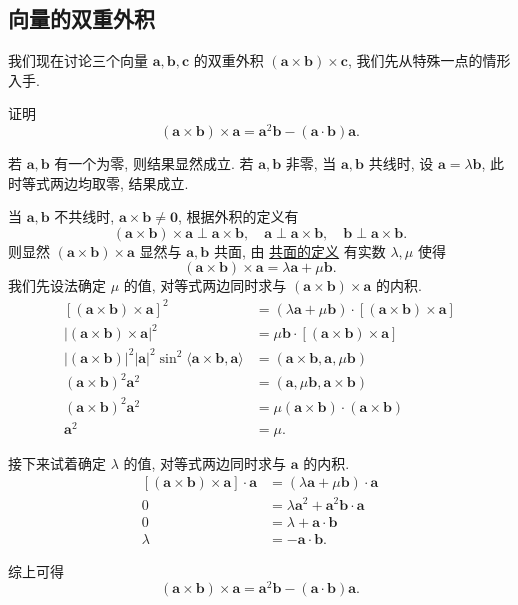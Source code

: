 \documentclass[cn,toc=twocol]{elegantbook}
\newcommand{\ve}[1]{\boldsymbol{#1}}
\newcommand{\vtimes}[2]{\ve{#1} \times \ve{#2}}
\begin{document}
\subsection{向量的双重外积}

我们现在讨论三个向量 $\ve a, \ve b, \ve c$ 的双重外积 $(\vtimes ab) \times\ve c$, 我们先从特殊一点的情形入手.

\begin{example}
	证明
	\[
		(\vtimes ab) \times \ve a = \ve a^2 \ve b - (\ve a \cdot \ve b) \ve a.
	\]
\end{example}

\begin{solution}
	若 $\ve a, \ve b$ 有一个为零, 则结果显然成立. 若 $\ve a, \ve b$ 非零, 当 $\ve a, \ve b$ 共线时, 设 $\ve a = \lambda \ve b$, 此时等式两边均取零, 结果成立.
	
	当 $\ve a, \ve b$ 不共线时, $\vtimes ab \neq \ve 0$, 根据外积的定义有
	\[
		(\vtimes ab)\times \ve a \perp \vtimes ab,\quad \ve a \perp \vtimes ab,\quad \ve b \perp \vtimes ab.
	\]
	则显然 $(\vtimes ab)\times \ve a$ 显然与 $\ve a, \ve b$ 共面, 由 \hyperref[def:coplanarity]{共面的定义} 有实数 $\lambda, \mu$ 使得
	\[
		(\vtimes ab)\times \ve a = \lambda \ve a + \mu \ve b.
	\]
	我们先设法确定 $\mu$ 的值, 对等式两边同时求与 $(\vtimes ab)\times \ve a$ 的内积.
	\[
	\begin{aligned}
		[(\vtimes ab)\times \ve a] ^2 &= (\lambda \ve a + \mu \ve b) \cdot [(\vtimes ab)\times \ve a]\\
		\lvert(\vtimes ab)\times \ve a\rvert ^2 &= \mu \ve b \cdot [(\vtimes ab)\times \ve a]\\
		\lvert (\vtimes ab) \rvert ^2 \lvert \ve a \rvert^2 \sin^2\langle \vtimes ab, \ve a \rangle &= (\vtimes ab, \ve a, \mu \ve b)\\
		(\vtimes ab)^2 \ve a ^2 &= (\ve a, \mu \ve b, \vtimes ab)\\
		(\vtimes ab)^2 \ve a ^2 &= \mu (\vtimes ab) \cdot (\vtimes ab)\\
		\ve a ^2 &= \mu.
	\end{aligned}
	\]
	
	接下来试着确定 $\lambda$ 的值, 对等式两边同时求与 $\ve a$ 的内积.
	\[
	\begin{aligned}
		[(\vtimes ab) \times \ve a] \cdot \ve a &= (\lambda \ve a + \mu \ve b) \cdot \ve a\\
		0 &= \lambda \ve a ^2 + \ve a^2 \ve b \cdot \ve a\\
		0 &= \lambda + \ve a \cdot \ve b\\
		\lambda &= - \ve a \cdot \ve b.
	\end{aligned}
	\]
	
	综上可得
	\[
		(\vtimes ab)\times \ve a = \ve a^2 \ve b - (\ve a \cdot \ve b) \ve a.
	\]
\end{solution}
\end{document}
